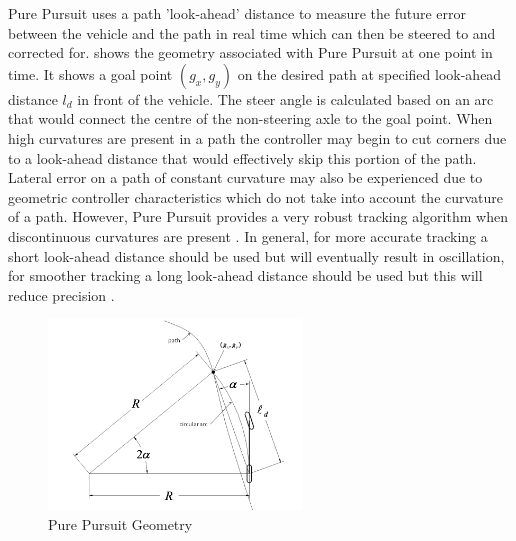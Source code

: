 \documentclass[main.tex]{subfiles}
\begin{document}
Pure Pursuit uses a path 'look-ahead' distance to measure the future error between the vehicle and the path in real time which can then be steered to and corrected for.  shows the geometry associated with Pure Pursuit at one point in time. It shows a goal point $(g_x, g_y)$ on the desired path at specified look-ahead distance $l_d$ in front of the vehicle. The steer angle is calculated based on an arc that would connect the centre of the non-steering axle to the goal point. When high curvatures are present in a path the controller may begin to cut corners due to a look-ahead distance that would effectively skip this portion of the path. Lateral error on a path of constant curvature may also be experienced due to geometric controller characteristics which do not take into account the curvature of a path. However, Pure Pursuit provides a very robust tracking algorithm when discontinuous curvatures are present \parencite{snider2009}. In general, for more accurate tracking a short look-ahead distance should be used but will eventually result in oscillation, for smoother tracking a long look-ahead distance should be used but this will reduce precision \parencite{snider2009}.
\begin{figure}[ht]
\includegraphics[width=0.6\textwidth]{3-LiteratureReview/purePursuitGoal.png}
\centering
\caption[Pure Pursuit Geometry]{Pure Pursuit Geometry \parencite{snider2009}} 
\end{figure}
\end{document}

